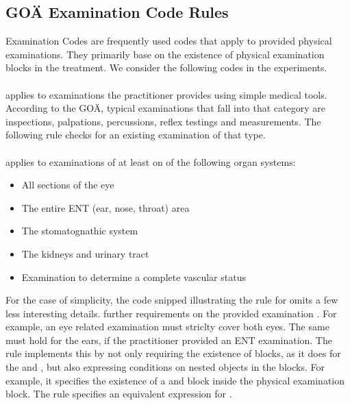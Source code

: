 \subsection{GOÄ Examination Code Rules}\label{subsec:examination-code-rules}
Examination Codes are frequently used codes that apply to provided physical examinations.
They primarily base on the existence of physical examination blocks in the treatment.
We consider the following codes in the experiments.

\paragraph{}
 applies to examinations the practitioner provides using simple medical tools.
According to the GOÄ, typical examinations that fall into that category are inspections, palpations, percussions, reflex testings and measurements.
The following rule checks for an existing examination of that type.


\paragraph{}
 applies to examinations of at least on of the following organ systems:
\begin{itemize}
    \item All sections of the eye
    \item The entire ENT (ear, nose, throat) area
    \item The stomatognathic system
    \item The kidneys and urinary tract
    \item Examination to determine a complete vascular status
\end{itemize}
For the case of simplicity, the code snipped illustrating the rule for  omits a few less interesting details.
 further requirements on the provided examination \cite{bruck1998kommentar}.
For example, an eye related examination must striclty cover both eyes.
The same must hold for the ears, if the practitioner provided an ENT examination.
The rule implements this by not only requiring the existence of blocks, as it does for the  and ,
but also expressing conditions on nested objects in the blocks.
For example, it specifies the existence of a  and  block inside the  physical examination block.
The rule specifies an equivalent expression for .

